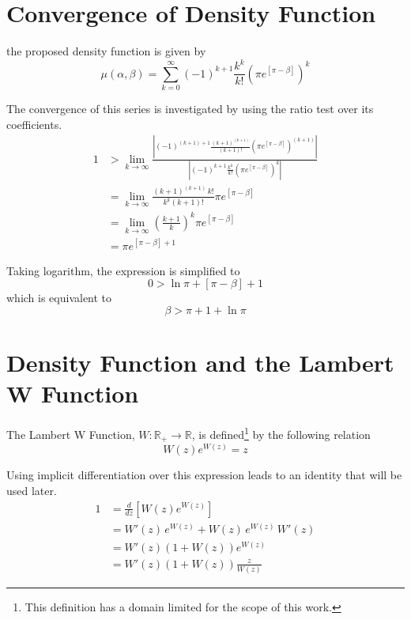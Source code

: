 \documentclass{article}
\newcommand{\R}{\mathbb{R}}
\newcommand{\aabs}[1]{\left| #1 \right|}
\newcommand{\ppar}[1]{\left( #1 \right)}
\newcommand{\spar}[1]{\left[ #1 \right]}
\begin{document}
\section{Convergence of Density Function}
\label{ap:convergence}

the proposed density function is given by
\begin{equation}
    \mu(\alpha, \beta) =
    \sum_{k=0}^{\infty}
    (-1)^{k+1} \frac{k^k}{k!} 
    \ppar{\pi
    e^{\spar{\pi-\beta}} }^k
\end{equation}

The convergence of this series is investigated by using the ratio test over its coefficients.
\begin{align*}
    1 &>
    \lim_{k\rightarrow \infty}
    \frac{\aabs{
    (-1)^{\ppar{k+1}+1} \frac{\ppar{k+1}^{\ppar{k+1}}}{\ppar{k+1}!} 
    \ppar{\pi
    e^{\spar{\pi-\beta}} }^{\ppar{k+1}}
    }}{\aabs{
    (-1)^{k+1} \frac{k^k}{k!} 
    \ppar{\pi
    e^{\spar{\pi-\beta}} }^k
    }}
    \\
    &=
    \lim_{k\rightarrow \infty}
    {
    \frac{\ppar{k+1}^{\ppar{k+1}}\, k! }{{k}^{k} \ppar{k+1}!}
    {\pi e^{\spar{\pi-\beta}} }
    }
    \\
    &=
    \lim_{k\rightarrow \infty}
    \ppar{\frac{k+1}{k}}^k {\pi e^{\spar{\pi-\beta}} }
    \\
    &=
    {\pi e^{\spar{\pi-\beta}+1} }
\end{align*}

Taking logarithm, the expression is simplified to
\begin{equation}
    0 > \ln{\pi} + \spar{\pi-\beta}+1
\end{equation}
which is equivalent to
\begin{equation}
    \beta > \pi + 1 + \ln{\pi}
\end{equation}

\section{Density Function and the Lambert W Function}
\label{ap:identities}

The Lambert W Function, $W: \R_+\rightarrow \R$, is defined\footnote{This definition has a domain limited for the scope of this work.} by the following relation
\begin{equation}
    W(z) e^{W(z)} = z
\end{equation}

Using implicit differentiation over this expression leads to an identity that will be used later.
\begin{align*}
    1 &=
    \frac{d}{d z} \spar{W(z) e^{W(z)}}
    \\ &=
    W'(z)\, e^{W(z)} + W(z)\, e^{W(z)}\, W'(z)
    \\ &=
    W'(z) \ppar{1+W\ppar{z}} e^{W(z)}
    \\ &=
    W'(z) \ppar{1+W\ppar{z}} \frac{z}{W(z)}
\end{align*}
\end{document}

